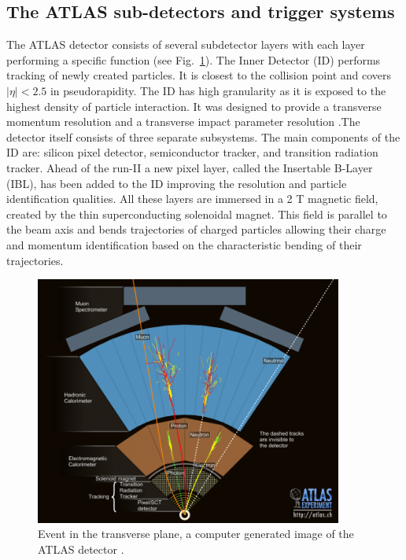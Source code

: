 \subsection{ The ATLAS sub-detectors and trigger systems}

The ATLAS detector consists of several subdetector layers with each layer performing a specific function (see Fig.~\ref{fig:event}). The Inner Detector (ID) performs tracking of newly created particles. It is closest to the collision point and covers $|\eta|<2.5$ in pseudorapidity. The ID has high granularity as it is exposed to the highest density of particle interaction. It was designed to provide a transverse momentum resolution and a transverse impact parameter resolution \citep{aad2010atlas}.The detector itself consists of three separate subsystems. The main components of the ID are: silicon pixel detector, semiconductor tracker, and transition radiation tracker. Ahead of the run-II a new pixel layer, called the Insertable B-Layer (IBL), has been added to the ID improving the resolution and particle identification qualities. All these layers are immersed in a 2 T magnetic field, created by the thin superconducting solenoidal magnet. This field is parallel to the beam axis and bends trajectories of charged particles allowing their charge and momentum identification based on the characteristic bending of their trajectories. 
\begin{figure}[!h]
	\centering
    \captionsetup{width=0.9\textwidth}
	\includegraphics[width=0.9\textwidth]{Chap2/0803022_01.jpg}
\caption{\label{fig:event} Event in the transverse plane, a computer generated image of the ATLAS detector \cite{event}. }
\end{figure}

